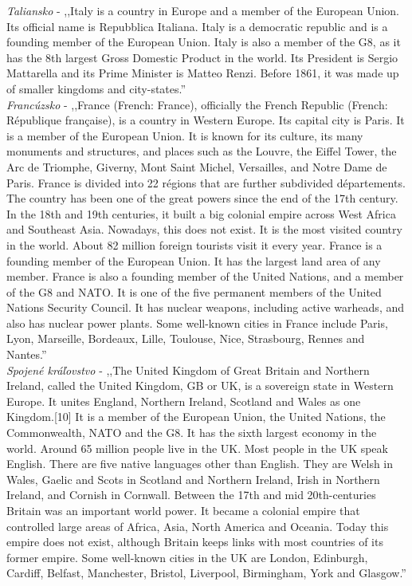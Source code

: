 \noindent
\textit{Taliansko} - ,,Italy is a country in Europe and a member of the European Union. Its official name is Repubblica Italiana. Italy is a democratic republic and is a founding member of the European Union. Italy is also a member of the G8, as it has the 8th largest Gross Domestic Product in the world. Its President is Sergio Mattarella and its Prime Minister is Matteo Renzi. Before 1861, it was made up of smaller kingdoms and city-states.'' \\

\noindent
\textit{Francúzsko} - ,,France (French: France), officially the French Republic (French: République française), is a country in Western Europe. Its capital city is Paris. It is a member of the European Union. It is known for its culture, its many monuments and structures, and places such as the Louvre, the Eiffel Tower, the Arc de Triomphe, Giverny, Mont Saint Michel, Versailles, and Notre Dame de Paris. France is divided into 22 régions that are further subdivided départements. The country has been one of the great powers since the end of the 17th century. In the 18th and 19th centuries, it built a big colonial empire across West Africa and Southeast Asia. Nowadays, this does not exist. It is the most visited country in the world. About 82 million foreign tourists visit it every year. France is a founding member of the European Union. It has the largest land area of any member. France is also a founding member of the United Nations, and a member of the G8 and NATO. It is one of the five permanent members of the United Nations Security Council. It has nuclear weapons, including active warheads, and also has nuclear power plants. Some well-known cities in France include Paris, Lyon, Marseille, Bordeaux, Lille, Toulouse, Nice, Strasbourg, Rennes and Nantes.'' \\

\noindent
\textit{Spojené kráľovstvo} - ,,The United Kingdom of Great Britain and Northern Ireland, called the United Kingdom, GB or UK, is a sovereign state in Western Europe. It unites England, Northern Ireland, Scotland and Wales as one Kingdom.[10] It is a member of the European Union, the United Nations, the Commonwealth, NATO and the G8. It has the sixth largest economy in the world. Around 65 million people live in the UK. Most people in the UK speak English. There are five native languages other than English. They are Welsh in Wales, Gaelic and Scots in Scotland and Northern Ireland, Irish in Northern Ireland, and Cornish in Cornwall. Between the 17th and mid 20th-centuries Britain was an important world power. It became a colonial empire that controlled large areas of Africa, Asia, North America and Oceania. Today this empire does not exist, although Britain keeps links with most countries of its former empire. Some well-known cities in the UK are London, Edinburgh, Cardiff, Belfast, Manchester, Bristol, Liverpool, Birmingham, York and Glasgow.'' \\


